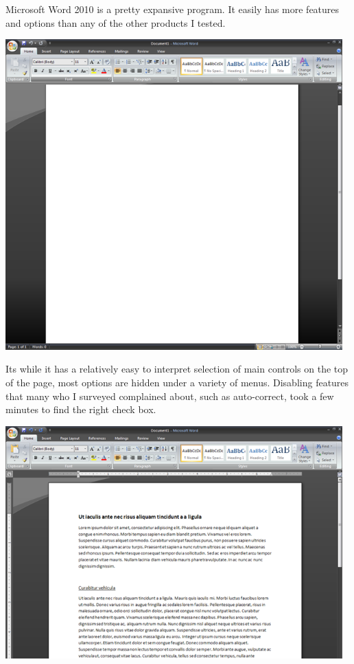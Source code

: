 \documentclass[11pt]{article}
\begin{document}
Microsoft Word 2010 is a pretty expansive program. It easily has more features and options than any of the other products I tested.

\includegraphics[width=130mm]{images/BlankWord.png}

Its while it has a relatively easy to interpret selection of main controls on the top of the page, most options are hidden under a variety of menus. Disabling features that many who I surveyed complained about, such as auto-correct, took a few minutes to find the right check box.

\includegraphics[width=130mm]{images/TextWord.png}
\end{document}
